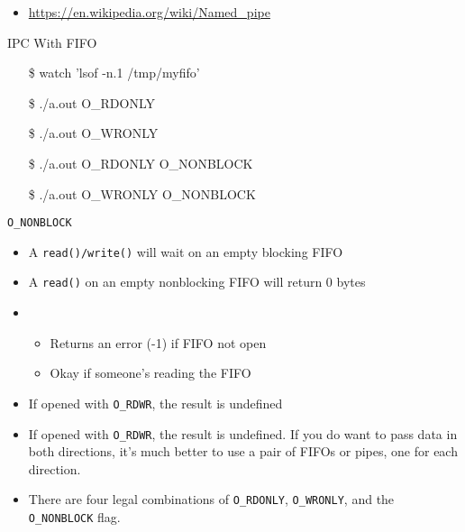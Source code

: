 \begin{itemize}
\item \url{https://en.wikipedia.org/wiki/Named_pipe}
\end{itemize}

\begin{frame}{IPC With FIFO}
\end{frame}

\begin{frame}{}{}
  {\ttfamily
    \begin{itemize}
    \item[\$] watch 'lsof -n.1 /tmp/myfifo'
    \item[\$] ./a.out O\_RDONLY
    \item[\$] ./a.out O\_WRONLY
    \item[\$] ./a.out O\_RDONLY O\_NONBLOCK
    \item[\$] ./a.out O\_WRONLY O\_NONBLOCK
    \end{itemize}}
  \begin{block}{\texttt{O\_NONBLOCK}}
    \begin{itemize}
    \item A \texttt{read()/write()} will wait on an empty blocking FIFO
    \item A \texttt{read()} on an empty nonblocking FIFO will return 0 bytes
    \item {}
      \begin{itemize}
      \item Returns an error (-1) if FIFO not open
      \item Okay if someone's reading the FIFO
      \end{itemize}
    \item If opened with \texttt{O\_RDWR}, the result is undefined
    \end{itemize}
  \end{block}
\end{frame}

\begin{itemize}
\item If opened with \texttt{O\_RDWR}, the result is undefined. If you do want to pass
  data in both directions, it's much better to use a pair of FIFOs or pipes, one for each
  direction.
\item There are four legal combinations of \texttt{O\_RDONLY}, \texttt{O\_WRONLY}, and the
  \texttt{O\_NONBLOCK} flag. 
\end{itemize}
\begin{longlisting}
\end{longlisting}

